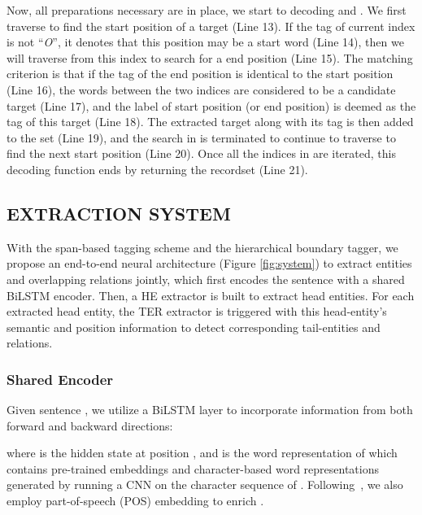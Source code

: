 \documentclass{ecai}
\begin{document}
Now, all preparations necessary are in place, we start to decoding  and . 
We first traverse  to find the start position of a target (Line 13). 
If the tag of current index is not ``\emph{O}'', it denotes that this position may be a start word (Line 14), then we will traverse  from this index to search for a end position (Line 15). 
The matching criterion is that if the tag of the end position is identical to the start position (Line 16), the words between the two indices are considered to be a candidate target (Line 17), and the label of start position (or end position) is deemed as the tag of this target (Line 18). 
The extracted target along with its tag is then added to the set  (Line 19), and the search in  is terminated to continue to traverse  to find the next start position (Line 20). 
Once all the indices in  are iterated, this decoding function ends by returning the recordset  (Line 21).



\subsection{EXTRACTION SYSTEM}


With the span-based tagging scheme and the hierarchical boundary tagger, we propose an end-to-end neural architecture (Figure \ref{fig:system}) to extract entities and overlapping relations jointly, which first encodes the sentence with a shared BiLSTM encoder. 
Then, a HE extractor is built to extract head entities. 
For each extracted head entity, the TER extractor is triggered with this head-entity's semantic and position information to detect corresponding tail-entities and relations.



\subsubsection{Shared Encoder} 
Given sentence , we utilize a BiLSTM layer to incorporate information from both forward and backward directions:

where  is the hidden state at position , and  is the word representation of  which contains pre-trained embeddings and character-based word representations generated by running a CNN on the character sequence of . 
 Following~\cite{fu-etal-2019-graphrel}, we also employ part-of-speech (POS) embedding to enrich .
\end{document}
